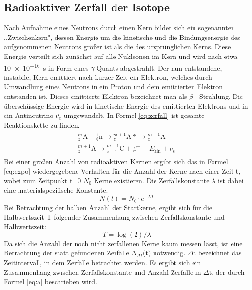 \subsection{Radioaktiver Zerfall der Isotope}
%
Nach Aufnahme eines Neutrons durch einen Kern bildet sich ein sogenannter ,,Zwischenkern", dessen Energie um die kinetische und die Bindungsenergie des aufgenommenen Neutrons größer ist als die des ursprünglichen Kerns. Diese Energie verteilt sich zunächst auf alle Nukleonen im Kern und wird nach etwa \SI{10e-16}{\second} in Form eines $\gamma$-Quants abgestrahlt. Der nun entstandene, instabile, Kern emittiert nach kurzer Zeit ein Elektron, welches durch Umwandlung eines Neutrons in ein Proton und dem emittierten Elektron entstanden ist. Dieses emittierte Elektron bezeichnet man als $\beta^{-}$-Strahlung. Die überschüssige Energie wird in kinetische Energie des emittierten Elektrons und in ein Antineutrino $\bar{\nu_{e}}$ umgewandelt. In Formel \eqref{eq:zerfall} ist gesamte Reaktionskette zu finden.
%
\begin{align}\label{eq:zerfall}
\begin{split}
{}^{m}_{z}\mathrm{A} + {}^{1}_{0}\mathrm{n} \longrightarrow {}^{m+1}_{z}\mathrm{A*} \longrightarrow {}^{m+1}_{z}\mathrm{A}\\
{}^{m+1}_{z}\mathrm{A} \longrightarrow {}^{m+1}_{z+1}\mathrm{C} + \beta^{-} + E_{\text{kin}} + \bar{\nu_\text{e}}
\end{split}
\end{align} 
%
Bei einer großen Anzahl von radioaktiven Kernen ergibt sich das in Formel \eqref{eq:expo} wiedergegebene Verhalten für die Anzahl der Kerne nach einer Zeit t, wobei zum Zeitpunkt t=0 $N_0$ Kerne existieren. Die Zerfallskonstante $\lambda$ ist dabei eine materialspezifische Konstante.
%
\begin{equation}
N(t) = N_0 \cdot e^{- \lambda T}
\label{eq:expo}
\end{equation}
Bei Betrachtung der halben Anzahl der Startkerne, ergibt sich für die Halbwertszeit T folgender Zusammenhang zwischen Zerfallskonstante und Halbwertszeit:
\begin{equation}
T = \log(2)/\lambda
\label{eq:halbwertszeit}
\end{equation}
%
Da sich die Anzahl der noch nicht zerfallenen Kerne kaum messen lässt, ist eine Betrachtung der statt gefundenen Zerfälle $N_{\Delta t}$(t) notwendig. $\Delta$t bezeichnet das Zeitintervall, in dem Zerfälle betrachtet werden. Es ergibt sich ein Zusammenhang zwischen Zerfallskonstante und Anzahl Zerfälle in $\Delta$t, der durch Formel \eqref{eq:a} beschrieben wird.
